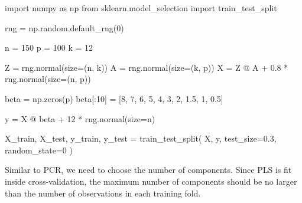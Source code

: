 \documentclass[
  letterpaper,
  DIV=11,
  numbers=noendperiod]{scrreprt}
\newenvironment{Shaded}{\begin{snugshade}}{\end{snugshade}}
\newcommand{\DecValTok}[1]{\textcolor[rgb]{0.68,0.00,0.00}{#1}}
\newcommand{\FloatTok}[1]{\textcolor[rgb]{0.68,0.00,0.00}{#1}}
\newcommand{\ImportTok}[1]{\textcolor[rgb]{0.00,0.46,0.62}{#1}}
\newcommand{\NormalTok}[1]{\textcolor[rgb]{0.00,0.23,0.31}{#1}}
\newcommand{\OperatorTok}[1]{\textcolor[rgb]{0.37,0.37,0.37}{#1}}
\theoremstyle{definition}
\theoremstyle{definition}
\theoremstyle{plain}
\theoremstyle{plain}
\theoremstyle{remark}
\begin{document}
\begin{Shaded}
\begin{Highlighting}[]
\ImportTok{import}\NormalTok{ numpy }\ImportTok{as}\NormalTok{ np}
\ImportTok{from}\NormalTok{ sklearn.model\_selection }\ImportTok{import}\NormalTok{ train\_test\_split}

\NormalTok{rng }\OperatorTok{=}\NormalTok{ np.random.default\_rng(}\DecValTok{0}\NormalTok{)}

\NormalTok{n }\OperatorTok{=} \DecValTok{150}
\NormalTok{p }\OperatorTok{=} \DecValTok{100}
\NormalTok{k }\OperatorTok{=} \DecValTok{12}

\NormalTok{Z }\OperatorTok{=}\NormalTok{ rng.normal(size}\OperatorTok{=}\NormalTok{(n, k))}
\NormalTok{A }\OperatorTok{=}\NormalTok{ rng.normal(size}\OperatorTok{=}\NormalTok{(k, p))}
\NormalTok{X }\OperatorTok{=}\NormalTok{ Z }\OperatorTok{@}\NormalTok{ A }\OperatorTok{+} \FloatTok{0.8} \OperatorTok{*}\NormalTok{ rng.normal(size}\OperatorTok{=}\NormalTok{(n, p))}

\NormalTok{beta }\OperatorTok{=}\NormalTok{ np.zeros(p)}
\NormalTok{beta[:}\DecValTok{10}\NormalTok{] }\OperatorTok{=}\NormalTok{ [}\DecValTok{8}\NormalTok{, }\DecValTok{7}\NormalTok{, }\DecValTok{6}\NormalTok{, }\DecValTok{5}\NormalTok{, }\DecValTok{4}\NormalTok{, }\DecValTok{3}\NormalTok{, }\DecValTok{2}\NormalTok{, }\FloatTok{1.5}\NormalTok{, }\DecValTok{1}\NormalTok{, }\FloatTok{0.5}\NormalTok{]}

\NormalTok{y }\OperatorTok{=}\NormalTok{ X }\OperatorTok{@}\NormalTok{ beta }\OperatorTok{+} \DecValTok{12} \OperatorTok{*}\NormalTok{ rng.normal(size}\OperatorTok{=}\NormalTok{n)}

\NormalTok{X\_train, X\_test, y\_train, y\_test }\OperatorTok{=}\NormalTok{ train\_test\_split(}
\NormalTok{    X, y, test\_size}\OperatorTok{=}\FloatTok{0.3}\NormalTok{, random\_state}\OperatorTok{=}\DecValTok{0}
\NormalTok{)}
\end{Highlighting}
\end{Shaded}

Similar to PCR, we need to choose the number of components. Since PLS is
fit inside cross-validation, the maximum number of components should be
no larger than the number of observations in each training fold.
\end{document}

